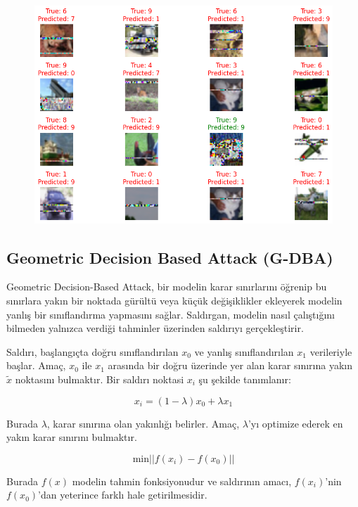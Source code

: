 \begin{figure}[h]
    \centering
    \includegraphics[width=1\textwidth]{images/frame_saliency_attack_results.png}
    \caption{}
\end{figure}

\newpage

\subsection{Geometric Decision Based Attack (G-DBA)}

Geometric Decision-Based Attack, bir modelin karar sınırlarını öğrenip bu sınırlara yakın bir noktada gürültü veya küçük değişiklikler ekleyerek modelin yanlış bir sınıflandırma yapmasını sağlar. Saldırgan, modelin nasıl çalıştığını bilmeden yalnızca verdiği tahminler üzerinden saldırıyı gerçekleştirir.

Saldırı, başlangıçta doğru sınıflandırılan $x_0$ ve yanlış sınıflandırılan $x_1$ verileriyle başlar. Amaç, $x_0$ ile $x_1$ arasında bir doğru üzerinde yer alan karar sınırına yakın $\tilde{x}$ noktasını bulmaktır. Bir saldırı noktasi $x_i$ şu şekilde tanımlanır:

\[ x_i  = (1 - \lambda) x_0 + \lambda x_1 \]

Burada $\lambda$, karar sınırına olan yakınlığı belirler. Amaç, $\lambda$'yı optimize ederek en yakın karar sınırını bulmaktır.

\[ \text{min} || f(x_i) - f(x_0) || \]

Burada $f(x)$ modelin tahmin fonksiyonudur ve saldırının amacı, $f(x_i)$'nin $f(x_0)$'dan yeterince farklı hale getirilmesidir.


